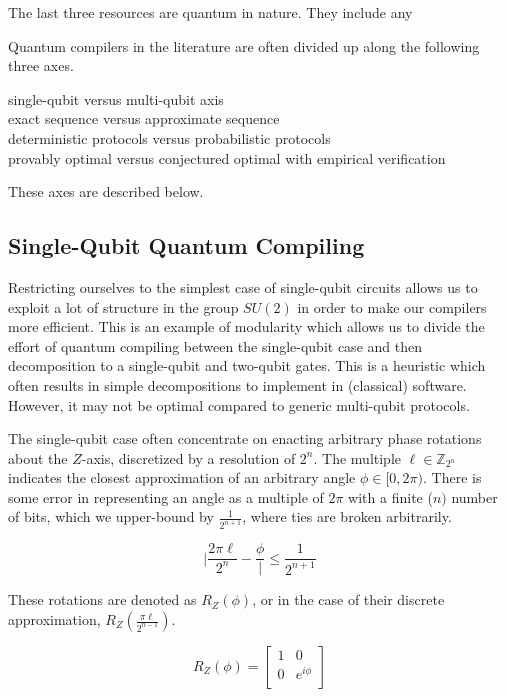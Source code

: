 The last three resources are quantum in nature. They include any

Quantum compilers in the literature are often divided up along
the following three axes.

\begin{description}
\item[single-qubit versus multi-qubit axis]
\item[exact sequence versus approximate sequence]
\item[deterministic protocols versus probabilistic protocols]
\item[provably optimal versus conjectured optimal with empirical verification]
\end{description}

These axes are described below.

\subsection{Single-Qubit Quantum Compiling}

Restricting ourselves to the simplest case of
single-qubit circuits allows us to exploit a lot of structure
in the group $SU(2)$ in order to make our compilers more
efficient. This is an example of modularity which allows us
to divide the effort of quantum compiling between the
single-qubit case and then decomposition to a single-qubit
and two-qubit gates. This is a heuristic which often results
in simple decompositions to implement in (classical) software.
However, it may not be optimal compared to generic 
multi-qubit protocols.

The single-qubit case often concentrate on enacting arbitrary
phase rotations about the $Z$-axis, discretized by a resolution of
$2^n$. The multiple $\ell \in \mathbb{Z}_{2^n}$ indicates the
closest approximation of an arbitrary angle $\phi \in [0,2\pi)$.
There is some error in representing an angle as a multiple of
$2\pi$ with a finite ($n)$ number of bits, which we upper-bound by
$\frac{1}{2^{n+1}}$, where ties are broken arbitrarily.

\begin{equation}
| \frac{2\pi \ell}{2^n} - \frac{\phi} | \le \frac{1}{2^{n+1}}
\end{equation}

These rotations are denoted as $R_Z(\phi)$, or in the case
of their discrete approximation, $R_Z(\frac{\pi \ell}{2^{n-1}})$.

\begin{equation}
 R_Z(\phi) = 
 \left[
  \begin{array}{cc}
    1 & 0 \\
    0 & e^{i\phi} \\
  \end{array} \right]
\end{equation}

